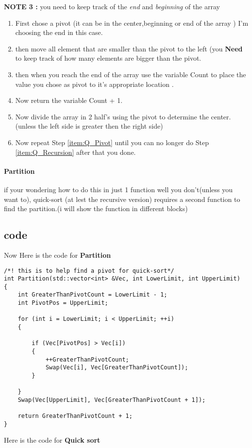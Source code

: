 \documentclass{article}
\begin{document}
\textbf{NOTE 3 :} you need to keep track of the \textit{end} and  \textit{beginning} of the array
\begin{enumerate}
\item First chose a pivot (it can be in the center,beginning or end of the array ) I'm choosing the end in this case.\label{item:Q_Pivot}
\item then move all element that are smaller than the pivot to the left (you \textbf{Need} to keep track of how many elements are bigger than the pivot. \label{item:Q_Order}
\item then when you reach the end of the array use the variable Count to place the value you chose as pivot to it's appropriate location .
\item Now return the variable Count + 1.
\item Now divide the array in 2 half's using the pivot to determine the center.(unless the left side is greater then the right side)\label{item:Q_Recursion}
\item Now repeat Step \ref{item:Q_Pivot} until you can no longer do Step \ref{item:Q_Recursion} after that you done. 

\end{enumerate}
\paragraph{Partition}\label{para:Partition} if your wondering how to do this in just 1 function well you don't(unless you want to), quick-sort (at lest the recursive version) requires a second function to find the partition.(i will show the function in different blocks)
\subsection{code}
Now Here is the code for \textbf{Partition}
\begin{lstlisting} 
/*! this is to help find a pivot for quick-sort*/
int Partition(std::vector<int> &Vec, int LowerLimit, int UpperLimit)
{
	int GreaterThanPivotCount = LowerLimit - 1;
	int PivotPos = UpperLimit;

	for (int i = LowerLimit; i < UpperLimit; ++i)
	{

		if (Vec[PivotPos] > Vec[i])
		{
			++GreaterThanPivotCount;
			Swap(Vec[i], Vec[GreaterThanPivotCount]);
		}

	}
	Swap(Vec[UpperLimit], Vec[GreaterThanPivotCount + 1]);

	return GreaterThanPivotCount + 1;
}
\end{lstlisting}
Here is the code for \textbf{Quick sort }
\end{document}
